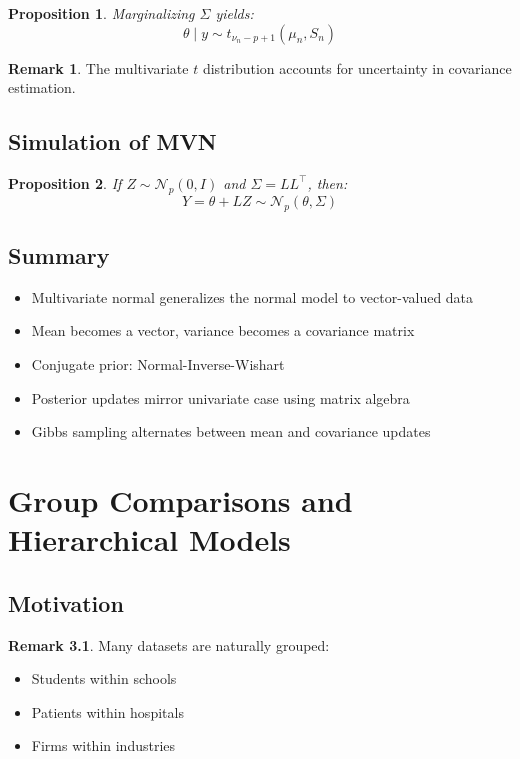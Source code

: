 \documentclass[12pt,oneside]{book}
\numberwithin{equation}{section}
\theoremstyle{definition}
\newtheorem{remark}{Remark}[section]
\theoremstyle{plain}
\newtheorem{proposition}{Proposition}[section]
\theoremstyle{remark}
\newcommand{\Normal}{\mathcal{N}}
\begin{document}
\begin{proposition}
Marginalizing $\Sigma$ yields:
$$
\theta \mid y \sim t_{\nu_n - p + 1}(\mu_n, S_n)
$$
\end{proposition}

\begin{remark}
The multivariate $t$ distribution accounts for uncertainty in covariance estimation.
\end{remark}

\section{Simulation of MVN}

\begin{proposition}
If $Z \sim \Normal_p(0, I)$ and $\Sigma = LL^\top$, then:
$$
Y = \theta + LZ \sim \Normal_p(\theta, \Sigma)
$$
\end{proposition}

\section{Summary}

\begin{itemize}
\item Multivariate normal generalizes the normal model to vector-valued data
\item Mean becomes a vector, variance becomes a covariance matrix
\item Conjugate prior: Normal-Inverse-Wishart
\item Posterior updates mirror univariate case using matrix algebra
\item Gibbs sampling alternates between mean and covariance updates
\end{itemize}

\chapter{Group Comparisons and Hierarchical Models}

\section{Motivation}

\begin{remark}
Many datasets are naturally grouped:
\begin{itemize}
\item Students within schools
\item Patients within hospitals
\item Firms within industries
\end{itemize}
\end{remark}
\end{document}
